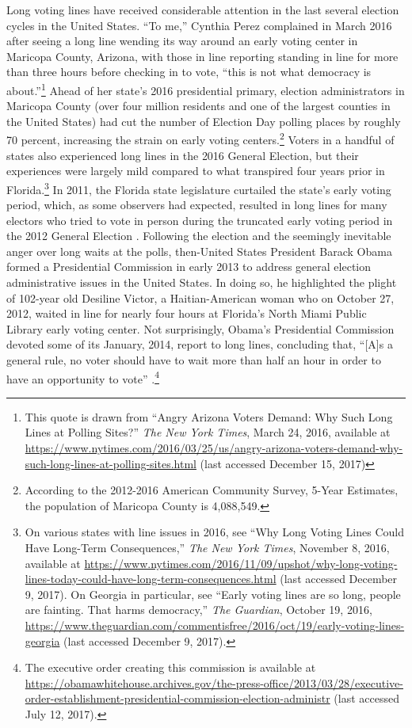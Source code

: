 \documentclass[12pt,titlepage]{article}
\begin{document}
Long voting lines have received considerable attention in the last
several election cycles in the United States.  ``To me,'' Cynthia
Perez complained in March 2016 after seeing a long line wending its
way around an early voting center in Maricopa County, Arizona, with
those in line reporting standing in line for more than three hours
before checking in to vote, ``this is not what democracy is
about.''\footnote{This quote is drawn from ``Angry Arizona Voters
  Demand: Why Such Long Lines at Polling Sites?'' \emph{The New York
    Times}, March 24, 2016, available at
  \url{https://www.nytimes.com/2016/03/25/us/angry-arizona-voters-demand-why-such-long-lines-at-polling-sites.html}
  (last accessed December 15, 2017)} Ahead of her state's 2016
presidential primary, election administrators in Maricopa County (over
four million residents and one of the largest counties in the United
States) had cut the number of Election Day polling places by roughly
70 percent, increasing the strain on early voting
centers.\footnote{According to the 2012-2016 American Community
  Survey, 5-Year Estimates, the population of Maricopa County is
  4,088,549.}  Voters in a handful of states also experienced long
lines in the 2016 General Election, but their experiences were largely
mild compared to what transpired four years prior in
Florida.\footnote{On various states with line issues in 2016, see
  ``Why Long Voting Lines Could Have Long-Term Consequences,''
  \emph{The New York Times}, November 8, 2016, available at
  \url{https://www.nytimes.com/2016/11/09/upshot/why-long-voting-lines-today-could-have-long-term-consequences.html}
  (last accessed December 9, 2017).  On Georgia in particular, see
  ``Early voting lines are so long, people are fainting. That harms
  democracy,'' \emph{The Guardian}, October 19, 2016,
  \url{https://www.theguardian.com/commentisfree/2016/oct/19/early-voting-lines-georgia}
  (last accessed December 9, 2017).}  In 2011, the Florida state
legislature curtailed the state's early voting period, which, as some
observers had expected, resulted in long lines for many electors who
tried to vote in person during the truncated early voting period in
the 2012 General Election \citep{herron_smith2014}.  Following the
election and the seemingly inevitable anger over long waits at the
polls, then-United States President Barack Obama formed a Presidential
Commission in early 2013 to address general election administrative
issues in the United States.  In doing so, he highlighted the plight
of 102-year old Desiline Victor, a Haitian-American woman who on
October 27, 2012, waited in line for nearly four hours at Florida's
North Miami Public Library early voting center.  Not surprisingly,
Obama's Presidential Commission devoted some of its January, 2014,
report to long lines, concluding that, ``[A]s a general rule, no voter
should have to wait more than half an hour in order to have an
opportunity to vote'' \citep[p.\ 13,][]{pcea:2014}.\footnote{The
  executive order creating this commission is available at
  \url{https://obamawhitehouse.archives.gov/the-press-office/2013/03/28/executive-order-establishment-presidential-commission-election-administr}
  (last accessed July 12, 2017).}
\end{document}
